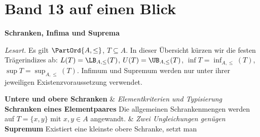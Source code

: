 \chapter[Band 13: Schranken, Infima und Suprema]{Band 13 auf einen Blick}
\noindent\textbf{Schranken, Infima und Suprema}\par\medskip
\noindent\emph{Lesart.} Es gilt \(\PartOrd{A,\leq}\),
\(T\subseteq A\). In dieser Übersicht kürzen wir die festen
Trägerindizes ab: \(L(T)=\LB_{A,\leq}(T)\),
\(U(T)=\UB_{A,\leq}(T)\), \(\inf T=\inf_{A,\leq}(T)\),
\(\sup T=\sup_{A,\leq}(T)\). Infimum und Supremum werden nur
unter ihrer jeweiligen Existenzvoraussetzung verwendet.
\begin{BandUebersicht}
\textbf{Untere und obere Schranken}
&
\textit{Elementkriterien und Typisierung}
\\
\addlinespace[.8ex]
\textbf{Schranken eines Elementpaares}
Die allgemeinen Schrankenmengen werden auf \(T=\{x,y\}\)
mit \(x,y\in A\) angewandt.
&
\textit{Zwei Ungleichungen genügen}
\\
\addlinespace[.8ex]
\textbf{Supremum}
Existiert eine kleinste obere Schranke, setzt man

\end{BandUebersicht}
